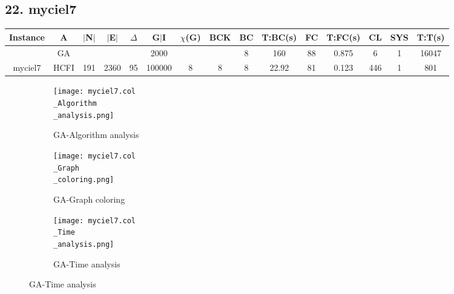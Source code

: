 \documentclass[10pt]{article}
\begin{document}
\subsection*{\hspace{0,9073976cm} 22. myciel7}
\begin{table}[H]
\centering
\begin{tabular}{|c|c|c|c|c|c|c|c|c|c|c|c|c|c|c|}
\hline
Instance& A &$|$N$|$ & $|$E$|$ & $\Delta$ & G$|$I & $\chi$(G) &BCK&BC & T:BC(s) & FC & T:FC(s) & CL & SYS & T:T(s) \\ \hline \hline

	&GA&       &                   &                     &  2000       &     \cellcolor{yellow} & {\cellcolor{yellow}}& {{\cellcolor{green}8}}
&160   & 88       &0.875                   &6                    &1          &16047        \\ \cline{2-2} \cline{6-6} \cline{9-15}
 \multirow{-2}{*}{myciel7} &HCFI   &\multirow{-2}{*}{191}   &\multirow{-2}{*}{2360}     &\multirow{-2}{*}{95}     &100000     &\multirow{-2}{*}{\cellcolor{yellow}8}      & \multirow{-2}{*}{\cellcolor{yellow}8}    &{\cellcolor{green}8}     &22.92         &81    &0.123         &446    &1     &801        \\ \hline 
\end{tabular}
\end{table}
\graphicspath{{./Core1/Solutions/GA/myciel7.col}}
\begin{figure}[H]
\begin{subfigure}{.33\textwidth}
  \centering
  \texttt{[image: myciel7.col\\\_Algorithm\\\_analysis.png]}
  \caption{GA-Algorithm analysis}
   \label{fig:subfig1}
\end{subfigure}%
\begin{subfigure}{.33\textwidth}
  \centering
  \texttt{[image: myciel7.col\\\_Graph\\\_coloring.png]}
  \caption{GA-Graph coloring}
  \label{fig:subfig2}
\end{subfigure}
\begin{subfigure}{.33\textwidth}
  \centering
  \texttt{[image: myciel7.col\\\_Time\\\_analysis.png]}
  \caption{GA-Time analysis}
  \end{subfigure}
\end{figure}
\end{document}
